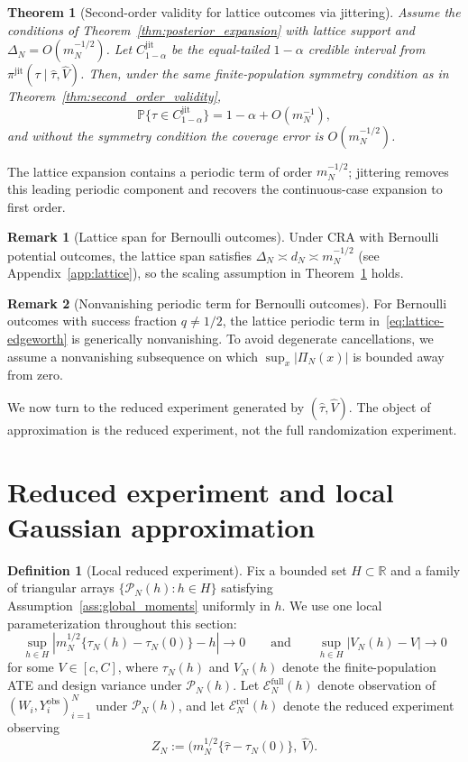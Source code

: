 \documentclass[aos]{imsart}
\newtheorem{theorem}{Theorem}
\theoremstyle{definition}
\newtheorem{definition}{Definition}
\newtheorem{remark}{Remark}
\theoremstyle{plain}
\newcommand{\Prb}{\mathbb{P}}
\newcommand{\mN}{m_N}
\newcommand{\R}{\mathbb{R}}
\begin{document}
\begin{theorem}[Second-order validity for lattice outcomes via jittering]\label{thm:lattice}
Assume the conditions of Theorem~\ref{thm:posterior_expansion} with lattice support and $\Delta_N=O(\mN^{-1/2})$.
Let $C^{\mathrm{jit}}_{1-\alpha}$ be the equal-tailed $1-\alpha$ credible interval from
$\pi^{\mathrm{jit}}(\tau\mid \hat\tau,\hat V)$.
Then, under the same finite-population symmetry condition as in Theorem~\ref{thm:second_order_validity},
\[
\Prb\{\tau\in C^{\mathrm{jit}}_{1-\alpha}\}
=
1-\alpha + O(\mN^{-1}),
\]
and without the symmetry condition the coverage error is $O(\mN^{-1/2})$.
\end{theorem}
The lattice expansion contains a periodic term of order $\mN^{-1/2}$; jittering removes this leading periodic component and recovers the continuous-case expansion to first order.

\begin{remark}[Lattice span for Bernoulli outcomes]\label{rem:lattice_span}
Under CRA with Bernoulli potential outcomes, the lattice span satisfies $\Delta_N\asymp d_N\asymp \mN^{-1/2}$ (see
Appendix~\ref{app:lattice}), so the scaling assumption in Theorem~\ref{thm:lattice} holds.
\end{remark}
\begin{remark}[Nonvanishing periodic term for Bernoulli outcomes]\label{rem:lattice_nonvanish}
For Bernoulli outcomes with success fraction $q\neq 1/2$, the lattice periodic term in~\eqref{eq:lattice-edgeworth} is generically nonvanishing. To avoid degenerate cancellations, we assume a nonvanishing subsequence on which $\sup_x|\Pi_N(x)|$ is bounded away from zero.
\end{remark}
We now turn to the reduced experiment generated by $(\hat\tau,\hat V)$. The object of approximation is the reduced experiment, not the full randomization experiment.

\section{Reduced experiment and local Gaussian approximation}\label{sec:sufficiency}

\begin{definition}[Local reduced experiment]\label{def:red-exp}
Fix a bounded set $H\subset\R$ and a family of triangular arrays $\{\mathcal P_N(h): h\in H\}$ satisfying Assumption~\ref{ass:global_moments} uniformly in $h$. We use one local parameterization throughout this section:
\[
\sup_{h\in H}\left|m_N^{1/2}\{\tau_N(h)-\tau_N(0)\}-h\right|\to 0
\qquad\text{and}\qquad
\sup_{h\in H}|V_N(h)-V|\to 0
\]
for some $V\in[c,C]$, where $\tau_N(h)$ and $V_N(h)$ denote the finite-population ATE and design variance under $\mathcal P_N(h)$. Let $\mathcal E_N^\mathrm{full}(h)$ denote observation of $(W_i,Y_i^{\mathrm{obs}})_{i=1}^N$ under $\mathcal P_N(h)$, and let $\mathcal E_N^\mathrm{red}(h)$ denote the reduced experiment observing
\[
Z_N:=\Big(m_N^{1/2}\{\hat\tau-\tau_N(0)\},\ \hat V\Big).
\]
\end{definition}
\end{document}
